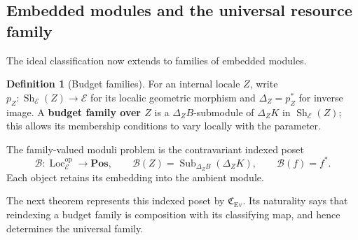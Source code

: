 \documentclass[11pt,a4paper]{article}
\numberwithin{algorithm}{section}
\numberwithin{equation}{section}
\theoremstyle{definition}
\newtheorem{definition}[definition]{Definition}
\theoremstyle{remark}
\theoremstyle{plain}
\newcommand{\E}{\mathcal E}
\newcommand{\Sub}{\operatorname{Sub}}
\newcommand{\Loc}{\operatorname{Loc}}
\newcommand{\Ev}{{\operatorname{Ev}}}
\newcommand{\Cplx}{\mathfrak C_{\Ev}}
\newcommand{\Sh}{\operatorname{Sh}}
\theoremstyle{definition}
\theoremstyle{plain}
\begin{document}
\subsection{Embedded modules and the universal resource family}
The ideal classification now extends to families of embedded modules.


\begin{definition}[Budget families]\label{def:budget-families}
For an internal locale $Z$, write
$p_Z:\Sh_{\E}(Z)\to\E$ for its localic geometric morphism and
$\Delta_Z=p_Z^*$ for inverse image. A \textbf{budget family over $Z$} is a $\Delta_ZB$-submodule
of $\Delta_ZK$ in $\Sh_{\E}(Z)$; this allows its membership conditions
to vary locally with the parameter.

The family-valued moduli problem is the contravariant indexed poset
\[
 \mathcal B:\Loc_\E^{\mathrm{op}}\longrightarrow\mathbf{Pos},
 \qquad
 \mathcal B(Z)=\Sub_{\Delta_ZB}(\Delta_ZK),\qquad
 \mathcal B(f)=f^*.
\]
Each object retains its embedding into the ambient module.
\end{definition}


The next theorem represents this indexed poset by $\Cplx$.
Its naturality says that reindexing a budget family is composition
with its classifying map, and hence determines the universal family.
\end{document}
